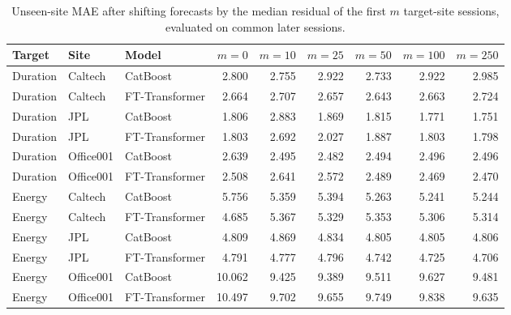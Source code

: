 \begin{table}[H]\centering\footnotesize
\caption{Unseen-site MAE after shifting forecasts by the median residual of the first $m$ target-site sessions, evaluated on common later sessions.}\label{tab:s-bias}
\begin{tabular}{lllrrrrrr}\toprule
Target & Site & Model & $m=0$ & $m=10$ & $m=25$ & $m=50$ & $m=100$ & $m=250$ \\\midrule
Duration & Caltech & CatBoost & 2.800 & 2.755 & 2.922 & 2.733 & 2.922 & 2.985 \\
Duration & Caltech & FT-Transformer & 2.664 & 2.707 & 2.657 & 2.643 & 2.663 & 2.724 \\
Duration & JPL & CatBoost & 1.806 & 2.883 & 1.869 & 1.815 & 1.771 & 1.751 \\
Duration & JPL & FT-Transformer & 1.803 & 2.692 & 2.027 & 1.887 & 1.803 & 1.798 \\
Duration & Office001 & CatBoost & 2.639 & 2.495 & 2.482 & 2.494 & 2.496 & 2.496 \\
Duration & Office001 & FT-Transformer & 2.508 & 2.641 & 2.572 & 2.489 & 2.469 & 2.470 \\
Energy & Caltech & CatBoost & 5.756 & 5.359 & 5.394 & 5.263 & 5.241 & 5.244 \\
Energy & Caltech & FT-Transformer & 4.685 & 5.367 & 5.329 & 5.353 & 5.306 & 5.314 \\
Energy & JPL & CatBoost & 4.809 & 4.869 & 4.834 & 4.805 & 4.805 & 4.806 \\
Energy & JPL & FT-Transformer & 4.791 & 4.777 & 4.796 & 4.742 & 4.725 & 4.706 \\
Energy & Office001 & CatBoost & 10.062 & 9.425 & 9.389 & 9.511 & 9.627 & 9.481 \\
Energy & Office001 & FT-Transformer & 10.497 & 9.702 & 9.655 & 9.749 & 9.838 & 9.635 \\
\bottomrule\end{tabular}\end{table}

